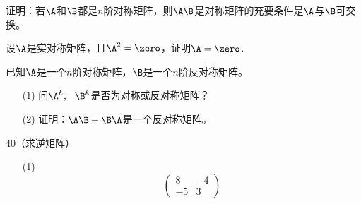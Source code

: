 \begin{frame}
  \begin{footnotesize}
    \begin{exampleblock}{37}
      证明：若$\A$和$\B$都是$n$阶对称矩阵，则$\A\B$是对称矩阵的充要条件是$\A$与$\B$可交换。
    \end{exampleblock}
  \end{footnotesize}
\end{frame}


\begin{frame}
  \begin{footnotesize}
    \begin{exampleblock}{38}
      设$\A$是实对称矩阵，且$\A^2=\zero$，证明$\A=\zero$.
    \end{exampleblock}
  \end{footnotesize}
\end{frame}



\begin{frame}
  \begin{footnotesize}
    \begin{exampleblock}{39}
      已知$\A$是一个$n$阶对称矩阵，$\B$是一个$n$阶反对称矩阵。
      \begin{itemize}
      \item[(1)]问$\A^k,~~\B^k$是否为对称或反对称矩阵？
      \item[(2)]证明：$\A\B+\B\A$是一个反对称矩阵。
      \end{itemize}
    \end{exampleblock}
  \end{footnotesize}
\end{frame}



\begin{frame}
  \begin{footnotesize}
    \begin{exampleblock}{40（求逆矩阵）}
      \begin{itemize}
      \item[(1)]
        $$
        \left(
        \begin{array}{rr}
          8&-4\\
          -5&3
        \end{array}
        \right)
        $$
      \end{itemize}
    \end{exampleblock}
  \end{footnotesize}
\end{frame}

